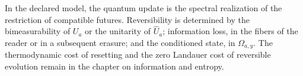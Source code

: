 \begin{statusbox}[title={Result and residence}]
In the declared model, the quantum update is the spectral realization of the restriction of compatible futures. Reversibility is determined by the bimeasurability of \(U_a\) or the unitarity of \(\widehat U_a\); information loss, in the fibers of the reader or in a subsequent erasure; and the conditioned state, in \(\Omega_{a,y}\). The thermodynamic cost of resetting and the zero Landauer cost of reversible evolution remain in the chapter on information and entropy.
\end{statusbox}
